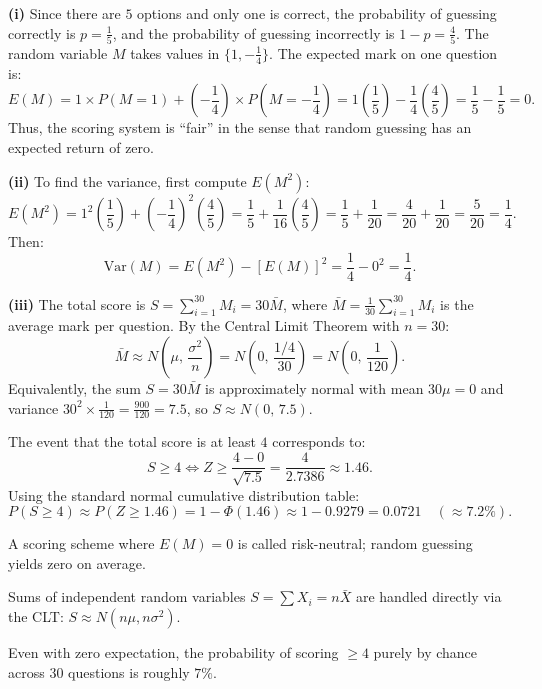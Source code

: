 \begin{solution}
\textbf{(i)} Since there are $5$ options and only one is correct, the probability of guessing correctly is $p = \frac{1}{5}$, and the probability of guessing incorrectly is $1 - p = \frac{4}{5}$.
The random variable $M$ takes values in $\{1, -\frac{1}{4}\}$. The expected mark on one question is:
\[
E(M) = 1 \times P(M = 1) + \left(-\frac{1}{4}\right) \times P\!\left(M = -\frac{1}{4}\right) = 1\left(\frac{1}{5}\right) - \frac{1}{4}\left(\frac{4}{5}\right) = \frac{1}{5} - \frac{1}{5} = \boxed{0}.
\]
Thus, the scoring system is ``fair'' in the sense that random guessing has an expected return of zero.

\textbf{(ii)} To find the variance, first compute $E(M^2)$:
\[
E(M^2) = 1^2 \left(\frac{1}{5}\right) + \left(-\frac{1}{4}\right)^2 \left(\frac{4}{5}\right) = \frac{1}{5} + \frac{1}{16}\left(\frac{4}{5}\right) = \frac{1}{5} + \frac{1}{20} = \frac{4}{20} + \frac{1}{20} = \frac{5}{20} = \frac{1}{4}.
\]
Then:
\[
\mathrm{Var}(M) = E(M^2) - [E(M)]^2 = \frac{1}{4} - 0^2 = \boxed{\frac{1}{4}}.
\]

\textbf{(iii)} The total score is $S = \sum_{i=1}^{30} M_i = 30\bar{M}$, where $\bar{M} = \frac{1}{30}\sum_{i=1}^{30} M_i$ is the average mark per question.
By the Central Limit Theorem with $n = 30$:
\[
\bar{M} \approx N\!\left(\mu,\, \frac{\sigma^2}{n}\right) = N\!\left(0,\, \frac{1/4}{30}\right) = N\!\left(0,\, \frac{1}{120}\right).
\]
Equivalently, the sum $S = 30\bar{M}$ is approximately normal with mean $30\mu = 0$ and variance $30^2 \times \frac{1}{120} = \frac{900}{120} = 7{.}5$, so $S \approx N(0,\, 7{.}5)$.

The event that the total score is at least $4$ corresponds to:
\[
S \geq 4 \iff Z \geq \frac{4 - 0}{\sqrt{7{.}5}} = \frac{4}{2{.}7386} \approx 1{.}46.
\]
Using the standard normal cumulative distribution table:
\[
P(S \geq 4) \approx P(Z \geq 1{.}46) = 1 - \Phi(1{.}46) \approx 1 - 0{.}9279 = \boxed{0{.}0721} \quad (\approx 7{.}2\%).
\]
\end{solution}

\begin{takeaways}
\item A scoring scheme where $E(M) = 0$ is called risk-neutral; random guessing yields zero on average.
\item Sums of independent random variables $S = \sum X_i = n\bar{X}$ are handled directly via the CLT: $S \approx N(n\mu, n\sigma^2)$.
\item Even with zero expectation, the probability of scoring $\geq 4$ purely by chance across $30$ questions is roughly $7\%$.
\end{takeaways}
